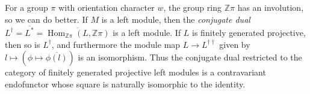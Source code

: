 \documentclass[12pt]{amsart}
\newtheorem{lemma}[theorem]{Lemma}
\theoremstyle{definition}
\newcommand{\Z}{\mathbb Z}
\DeclareMathOperator{\cok}{cok}
\DeclareMathOperator{\Hom}{Hom}
\DeclareMathOperator{\id}{id}
\newcommand{\ol}[1]{{\overline{#1}}}
\begin{document}
 For a group $\pi$ with orientation character $w$,  the group ring $\Z\pi$ has an involution, so we can do better.   If $M$ is a left module, then the {\em conjugate dual} $L^\dagger = \overline{L^*}= \overline{\Hom_{\mathbb{Z}\pi}(L,\mathbb{Z}\pi)}$ is a left module.  If $L$ is finitely generated projective, then so is $L^\dagger$, and furthermore the module map $L \to L^{\dagger \dagger}$ given by $l \mapsto (\phi \mapsto \ol{\phi(l)})$ is an isomorphism.  Thus the conjugate dual restricted to the category of finitely generated projective left modules is a contravariant endofunctor whose square is naturally isomorphic to the identity.
 
 
   







%
%
%
%
%
%
\end{document}

